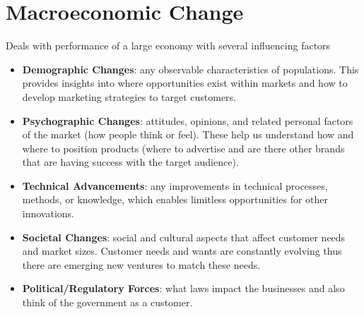 \documentclass{article}
\begin{document}
  \section{Macroeconomic Change}
  Deals with performance of a large economy with several influencing factors
  \begin{itemize}
    \item \textbf{Demographic Changes}: any observable characteristics of populations. This provides insights into where opportunities exist within markets and how to develop marketing strategies to target customers.
    \item \textbf{Psychographic Changes}: attitudes, opinions, and related personal factors of the market (how people think or feel). These help us understand how and where to position products (where to advertise and are there other brands that are having success with the target audience).
    \item \textbf{Technical Advancements}: any improvements in technical processes, methods, or knowledge, which enables limitless opportunities for other innovations.
    \item \textbf{Societal Changes}: social and cultural aspects that affect customer needs and market sizes. Customer needs and wants are constantly evolving thus there are emerging new ventures to match these needs.
    \item \textbf{Political/Regulatory Forces}: what laws impact the businesses and also think of the government as a customer.
  \end{itemize}
\end{document}
